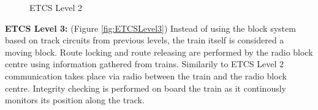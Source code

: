 \begin{center}
\begin{figure}[h!]



 \caption{ETCS Level 2}
\label{fig:ETCSLevel2}
\end{figure}
\end{center}


\textbf{ETCS Level 3:}  (Figure \ref{fig:ETCSLevel3})  Instead of using the block system based on track circuits from previous levels, the train itself is considered a moving block.  Route locking and route releasing are performed by the radio block centre using information gathered from trains. Similarily to ETCS Level 2 communication takes place via radio between the train and the radio block centre. Integrity checking is performed on board the train as it continously monitors its position along the track.




